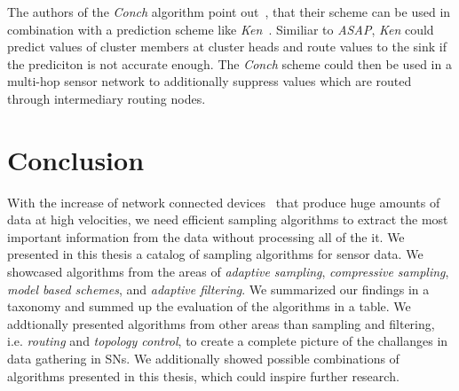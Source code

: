 The authors of the \textit{Conch} algorithm point
out~\cite{silberstein2006constraint}, that their scheme can be used in
combination with a prediction scheme like \textit{Ken}~\cite{jain2004adaptive}.
Similiar to \textit{ASAP}, \textit{Ken} could predict values of cluster members
at cluster heads and route values to the sink if the prediciton is not accurate
enough. The \textit{Conch} scheme could then be used in a multi-hop sensor
network to additionally suppress values which are routed through intermediary
routing nodes.

\section{Conclusion}

With the increase of network connected devices~\cite{gartner} that produce huge
amounts of data at high velocities, we need efficient sampling algorithms to
extract the most important information from the data without processing all of
the it. We presented in this thesis a catalog of sampling algorithms for sensor
data. We showcased algorithms from the areas of \textit{adaptive sampling},
\textit{compressive sampling}, \textit{model based schemes}, and
\textit{adaptive filtering}. We summarized our findings in a taxonomy and
summed up the evaluation of the algorithms in a table. We addtionally presented
algorithms from other areas than sampling and filtering, i.e. \textit{routing}
and \textit{topology control}, to create a complete picture of the challanges
in data gathering in \acp{SN}. We additionally showed possible combinations of
algorithms presented in this thesis, which could inspire further research.




